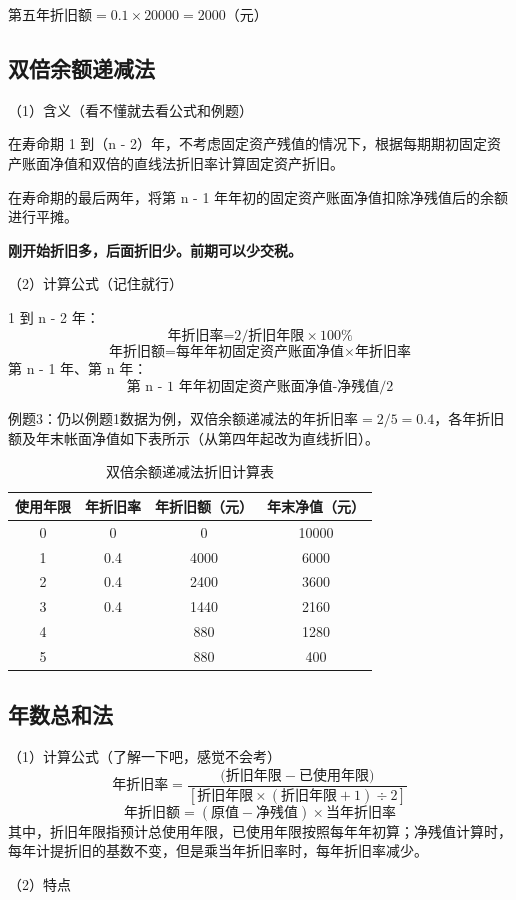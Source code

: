 第五年折旧额$=0.1 \times 20000 = 2000$（元）

\subsection{双倍余额递减法}
（1）含义（看不懂就去看公式和例题）

在寿命期 1 到（n - 2）年，不考虑固定资产残值的情况下，根据每期期初固定资产账面净值和双倍的直线法折旧率计算固定资产折旧。

在寿命期的最后两年，将第 n - 1 年年初的固定资产账面净值扣除净残值后的余额进行平摊。

\textbf{刚开始折旧多，后面折旧少。前期可以少交税。}

（2）计算公式（记住就行）

1 到 n - 2 年：
$$\mbox{年折旧率=}2 / \mbox{折旧年限} \times 100\%$$
$$\mbox{年折旧额=每年年初固定资产账面净值} \times \mbox{年折旧率}$$
第 n - 1 年、第 n 年：
$$\mbox{第 n - 1 年年初固定资产账面净值-净残值} /2$$

例题3：仍以例题1数据为例，双倍余额递减法的年折旧率$=2/5=0.4$，各年折旧额及年末帐面净值如下表所示（从第四年起改为直线折旧）。
\begin{table}[H]
\centering
\caption{双倍余额递减法折旧计算表}
\begin{tabular}{cccc}
\toprule
使用年限 & 年折旧率 & 年折旧额（元） & 年末净值（元） \\
\midrule
0 & 0 & 0 & 10000 \\
1 & 0.4 & 4000 & 6000 \\
2 & 0.4 & 2400 & 3600 \\
3 & 0.4 & 1440 & 2160 \\
4 &  & 880 & 1280 \\
5 &  & 880 & 400 \\
\bottomrule
\end{tabular}
\end{table}

\subsection{年数总和法}
（1）计算公式（了解一下吧，感觉不会考）
$$\mbox{年折旧率}=\frac{(\mbox{折旧年限}-\mbox{已使用年限)}}{[\mbox{折旧年限} \times (\mbox{折旧年限}+1)\div 2]}$$
$$\mbox{年折旧额}=(\mbox{原值}-\mbox{净残值}) \times \mbox{当年折旧率}$$
其中，折旧年限指预计总使用年限，已使用年限按照每年年初算；净残值计算时，每年计提折旧的基数不变，但是乘当年折旧率时，每年折旧率减少。

（2）特点

